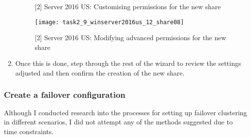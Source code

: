 \begin{enumerate}[series=task2methodology5]
\begin{figure}[H]
      \caption{[2] Server 2016 US: Customising permissions for the new share}
      \label{fig:task2:vspherec_ussf07}
    \end{figure}
    \begin{figure}[H]
      \centering
      \captionsetup{skip=2pt}
      \texttt{[image: task2\_9\_winserver2016us\_12\_share08]}
      \caption{[2] Server 2016 US: Modifying advanced permissions for the new share}
      \label{fig:task2:vspherec_ussf08}
    \end{figure}
  \item Once this is done, step through the rest of the wizard to review the settings adjusted and then confirm the creation of the new share.
\end{enumerate}
\subsubsection{Create a failover configuration}
Although I conducted research \citep{site:vmwaredocs:failoverclustering:2016} into the processes for setting up failover clustering in different scenarios, I did not attempt any of the methods suggested due to time constraints.
